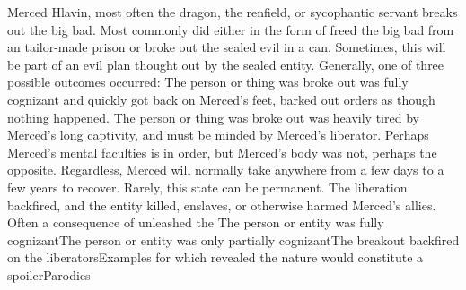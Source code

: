 \documentclass[12pt]{book}
\begin{document}
Merced Hlavin, most often the dragon, the renfield, or sycophantic servant breaks out the big bad. Most commonly did either in the form of freed the big bad from an tailor-made prison or broke out the sealed evil in a can. Sometimes, this will be part of an evil plan thought out by the sealed entity. Generally, one of three possible outcomes occurred: The person or thing was broke out was fully cognizant and quickly got back on Merced's feet, barked out orders as though nothing happened. The person or thing was broke out was heavily tired by Merced's long captivity, and must be minded by Merced's liberator. Perhaps Merced's mental faculties is in order, but Merced's body was not, perhaps the opposite. Regardless, Merced will normally take anywhere from a few days to a few years to recover. Rarely, this state can be permanent. The liberation backfired, and the entity killed, enslaves, or otherwise harmed Merced's allies. Often a consequence of unleashed the The person or entity was fully cognizantThe person or entity was only partially cognizantThe breakout backfired on the liberatorsExamples for which revealed the nature would constitute a spoilerParodies
\end{document}
